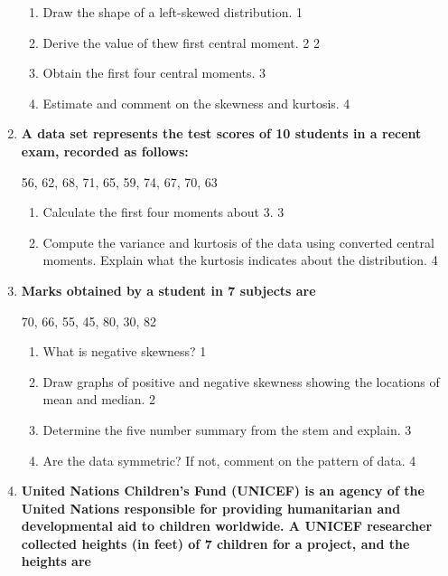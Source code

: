 \documentclass[a4paper,oneside]{book}
\begin{document}
\begin{enumerate}
  \begin{enumerate}
	\item 
	Draw the shape of a left-skewed distribution. \hfill 1
	\item 
	Derive the value of thew first central moment. \hfill 2 \hfill 2
    \item
    Obtain the first four central moments. \hfill 3
    \item
	Estimate and comment on the skewness and kurtosis. \hfill 4
  \end{enumerate}
  
  \item
\textbf{A data set represents the test scores of 10 students in a recent exam, recorded as follows:}

\begin{center}
56, 62, 68, 71, 65, 59, 74, 67, 70, 63
\end{center}

\begin{enumerate}
\item
Calculate the first four moments about 3. \hfill 3
\item
Compute the variance and kurtosis of the data using converted central moments. 
Explain what the kurtosis indicates about the distribution. \hfill 4
\end{enumerate}


 \item
	  \textbf{Marks obtained by a student in 7 subjects are} 
	  \begin{center}
	  70, 66, 55, 45, 80, 30, 82
	\end{center}
  
  \begin{enumerate}
    \item
	What is negative skewness? \hfill 1
    \item
	Draw graphs of positive and negative skewness showing the locations of mean and median. \hfill 2
    \item  
	Determine the five number summary from the stem and explain. \hfill 3
    \item
	Are the data symmetric? If not, comment on the pattern of data. \hfill 4
\end{enumerate}

 \item
	  \textbf{United Nations Children's Fund (UNICEF) is an agency of the United Nations responsible for providing humanitarian and developmental aid to children worldwide. A  UNICEF researcher collected heights (in feet) of 7 children for a project, and the heights are} 


\end{enumerate}
\end{document}
